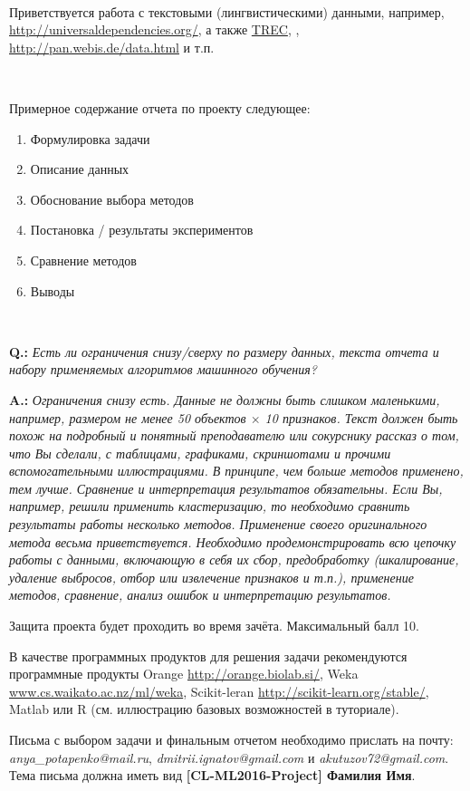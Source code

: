 \documentclass[12pt]{article}         %
\begin{document}
 \

Приветствуется работа с текстовыми (лингвистическими) данными, например, \url{http://universaldependencies.org/}, а также \href{http://trec.nist.gov/}{TREC}, \href{http://www.clef-initiative.eu/dataset/test-collection}{}, \url{http://pan.webis.de/data.html} и т.п.


 \

Примерное содержание отчета по проекту следующее:
\begin{enumerate}
  \item Формулировка задачи
  \item Описание данных
  \item Обоснование выбора методов
  \item Постановка / результаты экспериментов
  \item Сравнение методов
  \item Выводы
\end{enumerate}

\

\textbf{Q.:} \textit{Есть ли ограничения снизу/сверху по размеру данных, текста отчета и набору применяемых алгоритмов машинного обучения?}

\textbf{A.:} \textit{Ограничения снизу есть. Данные не должны быть слишком маленькими, например, размером не менее 50 объектов $\times$ 10 признаков. Текст должен быть похож на подробный и понятный преподавателю или сокурснику рассказ о том, что Вы сделали, с таблицами, графиками, скриншотами и прочими вспомогательными иллюстрациями. В принципе, чем больше методов применено, тем лучше. Сравнение и интерпретация результатов обязательны. Если Вы, например, решили применить кластеризацию, то необходимо сравнить результаты работы несколько методов. Применение своего оригинального метода весьма приветствуется. Необходимо продемонстрировать всю цепочку работы с данными, включающую в себя их сбор, предобработку (шкалирование, удаление выбросов, отбор или извлечение признаков и т.п.), применение методов, сравнение, анализ ошибок и интерпретацию результатов.}

Защита проекта будет проходить во время зачёта. Максимальный балл 10.

В качестве программных продуктов для решения задачи рекомендуются программные продукты Orange \url{http://orange.biolab.si/}, Weka \url{www.cs.waikato.ac.nz/ml/weka}, Scikit-leran \url{http://scikit-learn.org/stable/}, Matlab или R (см. иллюстрацию базовых возможностей в туториале).




Письма с выбором задачи и финальным отчетом необходимо прислать на почту: \textit{anya\_potapenko@mail.ru}, \textit{dmitrii.ignatov@gmail.com} и \textit{akutuzov72@gmail.com}. Тема письма должна иметь вид \textbf{[CL-ML2016-Project] Фамилия Имя}.
\end{document}
